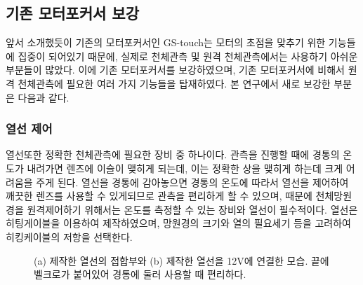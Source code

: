 \documentclass[twoside,11pt]{gshs_thesis}
\begin{document}
\subsection{기존 모터포커서 보강}

앞서 소개했듯이 기존의 모터포커서인 GS-touch는 모터의 초점을 맞추기 위한 기능들에 집중이 되어있기 때문에, 실제로 천체관측 및 원격 천체관측에서는 사용하기 아쉬운 부분들이 많았다. 이에 기존 모터포커서를 보강하였으며, 기존 모터포커서에 비해서 원격 천체관측에 필요한 여러 가지 기능들을 탑재하였다. 본 연구에서 새로 보강한 부분은 다음과 같다.
\subsubsection{열선 제어}
열선또한 정확한 천체관측에 필요한 장비 중 하나이다. 관측을 진행할 때에 경통의 온도가 내려가면 렌즈에 이슬이 맺히게 되는데, 이는 정확한 상을 맺히게 하는데 크게 어려움을 주게 된다. 열선을 경통에 감아놓으면 경통의 온도에 따라서 열선을 제어하여 깨끗한 렌즈를 사용할 수 있게되므로 관측을 편리하게 할 수 있으며, 때문에 천체망원경을 원격제어하기 위해서는 온도를 측정할 수 있는 장비와 열선이 필수적이다. 열선은 히팅게이블을 이용하여 제작하였으며, 망원경의 크기와 열의 필요세기 등을 고려하여 히킹케이블의 저항을 선택한다.

 \begin{figure}[h]
	\begin{center}
	\end{center}
	\caption{(a) 제작한 열선의 접합부와 (b) 제작한 열선을 12V에 연결한 모습. 끝에 벨크로가 붙어있어 경통에 둘러 사용할 때 편리하다.}
	\label{thermic}
\end{figure}
\end{document}
